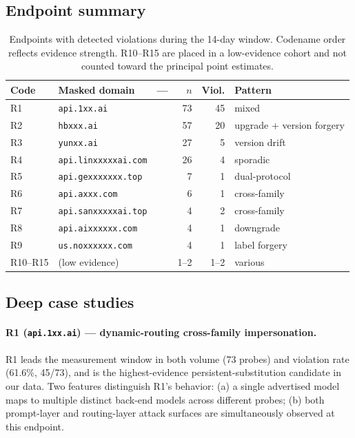 \documentclass[10pt,a4paper,twocolumn]{article}
\begin{document}
\subsection{Endpoint summary}\label{sec:endpoints}

\begin{table}[h]
\centering
\small
\begin{tabular}{@{}lllrrl@{}}
\toprule
Code & Masked domain & --- & $n$ & Viol. & Pattern \\
\midrule
R1 & \texttt{api.1xx.ai} & & 73 & 45 & mixed \\
R2 & \texttt{hbxxx.ai} & & 57 & 20 & upgrade + version forgery \\
R3 & \texttt{yunxx.ai} & & 27 & 5 & version drift \\
R4 & \texttt{api.linxxxxxai.com} & & 26 & 4 & sporadic \\
R5 & \texttt{api.gexxxxxxx.top} & & 7 & 1 & dual-protocol \\
R6 & \texttt{api.axxx.com} & & 6 & 1 & cross-family \\
R7 & \texttt{api.sanxxxxxai.top} & & 4 & 2 & cross-family \\
R8 & \texttt{api.aixxxxxx.com} & & 4 & 1 & downgrade \\
R9 & \texttt{us.noxxxxxx.com} & & 4 & 1 & label forgery \\
R10--R15 & (low evidence) & & 1--2 & 1--2 & various \\
\bottomrule
\end{tabular}
\caption{Endpoints with detected violations during the 14-day window. Codename
order reflects evidence strength. R10--R15 are placed in a low-evidence
cohort and not counted toward the principal point estimates.}
\label{tab:endpoints}
\end{table}

\subsection{Deep case studies}\label{sec:cases}

\paragraph{R1 (\texttt{api.1xx.ai}) --- dynamic-routing cross-family impersonation.}
R1 leads the measurement window in both volume (73 probes) and violation rate
(61.6\%, 45/73), and is the highest-evidence persistent-substitution candidate in
our data. Two features distinguish R1's behavior: (a) a single advertised model
maps to multiple distinct back-end models across different probes; (b) both
prompt-layer and routing-layer attack surfaces are simultaneously observed at
this endpoint.
\end{document}
